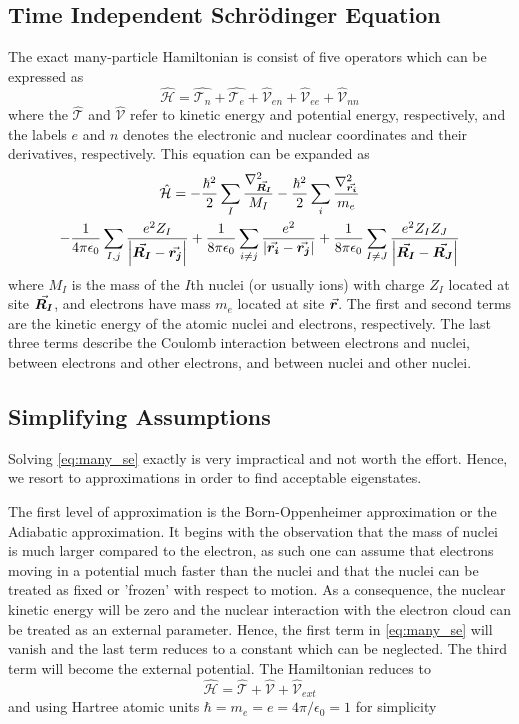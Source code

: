    \subsection{Time Independent Schr{\"o}dinger Equation}
The exact many-particle Hamiltonian is consist of five operators which can be expressed as 
\begin{equation}
    \hat{\mathcal{H}} = \hat{\mathcal{T}_n} + \hat{\mathcal{T}_e} + \hat{\mathcal{V}}_{en} + \hat{\mathcal{V}}_{ee}  + \hat{\mathcal{V}}_{nn} 
\end{equation}
where the $\hat{\mathcal{T}}$ and $\hat{\mathcal{V}}$ refer to kinetic energy and potential energy, respectively, and the labels $e$ and $n$ denotes the electronic and nuclear coordinates and their derivatives, respectively.  This equation can be expanded as 
\begin{multline} \label{eq:many_se}
    \hat{\mathcal{H}}  = - \frac{\hbar^2}{2} \sum_I \frac{\laplacian_{\va*{R_I}}}{M_I} - \frac{\hbar^2}{2} \sum_i \frac{\laplacian_{\va*{r_i}}}{m_e} \\
    - \frac{1}{4 \pi \epsilon_0} \sum_{I,j} \frac{e^2 Z_I}{\abs{\va*{R_I} - \va*{r_j}}} + \frac{1}{8 \pi \epsilon_0} \sum_{i\neq j} \frac{e^2}{\abs{\va*{r_i} - \va*{r_j}}} + \frac{1}{8 \pi \epsilon_0} \sum_{I\neq J} \frac{e^2 Z_I Z_J}{\abs{\va*{R_I} - \va*{R_J}}} 
\end{multline}
where $M_I$ is the mass of the $I$th nuclei (or usually ions) with charge $Z_I$ located at site $\va*{R_I}$, and electrons have mass $m_e$  located at site $\va*{r}$. The first and second terms are the kinetic energy of the atomic nuclei and electrons, respectively. The last three terms
describe the Coulomb interaction between electrons and nuclei, between electrons and other electrons, and between nuclei and other nuclei. 

\subsection{Simplifying Assumptions}
    Solving \eqref{eq:many_se} exactly is very impractical and not worth the effort. Hence, we resort to approximations in order to find acceptable eigenstates. 

    The first level of approximation is the Born-Oppenheimer approximation or the Adiabatic approximation. It begins with the observation that the mass of nuclei is much larger compared to the electron, as such one can assume that electrons moving in a potential much faster than the nuclei and that the nuclei can be treated as fixed or 'frozen' with respect to motion. As a consequence, the nuclear kinetic energy will be zero and the nuclear interaction with the electron cloud  can be treated as an external parameter. Hence, the first  term in \eqref{eq:many_se} will vanish and the last term reduces to a constant which can be neglected. The third term will become the external potential. The Hamiltonian reduces to 
    \begin{equation}
        \hat{\mathcal{H}}  = \hat{\mathcal{T}} + \hat{\mathcal{V}} + \hat{\mathcal{V}}_{ext}
    \end{equation}
    and using Hartree atomic units $\hbar = m_e = e = 4 \pi / \epsilon_0 =1$ for simplicity 

